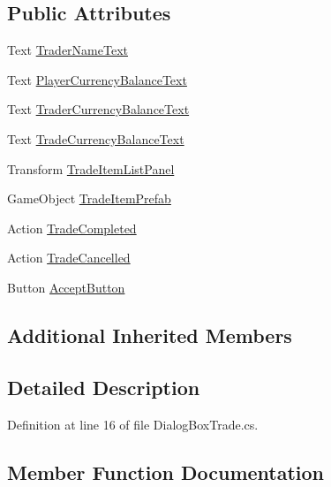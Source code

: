 \subsection*{Public Attributes}
\begin{DoxyCompactItemize}
\item 
Text \hyperlink{class_dialog_box_trade_a39f78d608909c5f4d0e1ee8e43348e07}{Trader\+Name\+Text}
\item 
Text \hyperlink{class_dialog_box_trade_aac85a37a74b69a78f44d7f06ba10108f}{Player\+Currency\+Balance\+Text}
\item 
Text \hyperlink{class_dialog_box_trade_a44857603ccdc822f48023d32d95c667c}{Trader\+Currency\+Balance\+Text}
\item 
Text \hyperlink{class_dialog_box_trade_a8c5b28e84e8b07b0f29af9e3f93a1484}{Trade\+Currency\+Balance\+Text}
\item 
Transform \hyperlink{class_dialog_box_trade_a3c6763a9d1cb2b5a56faea2ba5c95c82}{Trade\+Item\+List\+Panel}
\item 
Game\+Object \hyperlink{class_dialog_box_trade_a5f2791c62e9b64d3f94362d9910e7d38}{Trade\+Item\+Prefab}
\item 
Action \hyperlink{class_dialog_box_trade_ad066dd213fd5d115915568a7b460144e}{Trade\+Completed}
\item 
Action \hyperlink{class_dialog_box_trade_a6b806699237ac3b11e71bb1ef1227a18}{Trade\+Cancelled}
\item 
Button \hyperlink{class_dialog_box_trade_a5afdc78665cfba7a63f47fd99573fc8b}{Accept\+Button}
\end{DoxyCompactItemize}
\subsection*{Additional Inherited Members}


\subsection{Detailed Description}


Definition at line 16 of file Dialog\+Box\+Trade.\+cs.



\subsection{Member Function Documentation}
\mbox{\label{class_dialog_box_trade_a4564302a9198b93145958cd75a22339a}} 
